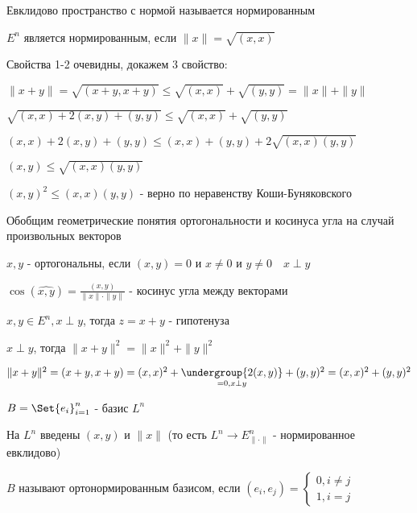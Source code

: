 \documentclass[12pt]{article}
\begin{document}
    \hypertarget{normalizedeuclidspace}{}

    Евклидово пространство с нормой называется нормированным

    \begin{MyTheorem}
        \Ths $E^n$ является нормированным, если $\|x\| = \sqrt{(x, x)}$
    \end{MyTheorem}

    \begin{MyProof}
        Свойства 1-2 очевидны, докажем 3 свойство:

        $\|x + y\| = \sqrt{(x + y, x + y)} \leq \sqrt{(x, x)} + \sqrt{(y, y)} = \|x\| + \|y\|$

        $\sqrt{(x, x) + 2(x, y) + (y, y)} \leq \sqrt{(x, x)} + \sqrt{(y, y)}$

        $(x, x) + 2(x, y) + (y, y) \leq (x, x) + (y, y) + 2\sqrt{(x, x)(y, y)}$

        $(x, y) \leq \sqrt{(x, x)(y, y)}$

        $(x, y)^2 \leq (x, x)(y, y)$ - верно по неравенству Коши-Буняковского
    \end{MyProof}

    Обобщим геометрические понятия ортогональности и косинуса угла на случай произвольных векторов

    \Def $x, y$ - ортогональны, если $(x, y) = 0$ и $x \neq 0$ и $y \neq 0 \quad x \perp y$

    \Def $\cos(\widehat{x, y}) = \frac{(x, y)}{\|x\|\cdot\|y\|}$ - косинус угла между векторами

    \Def $x, y \in E^n, x \perp y$, тогда $z = x + y$ - гипотенуза

    \begin{MyTheorem}
        \Ths $x \perp y$, тогда $\|x + y\|^2 = \|x\|^2 + \|y\|^2$
    \end{MyTheorem}

    \begin{MyProof}
        $\|x + y\|^2 = (x + y, x + y) = (x, x)^2 + \underset{= 0, x \perp y}{\undergroup{2(x, y)}} + (y, y)^2 = (x, x)^2 + (y, y)^2$
    \end{MyProof}

    \Def $B = \Set{e_i}_{i=1}^n$ - базис $L^n$

    На $L^n$ введены $(x, y)$ и $\|x\|$ (то есть $L^n \to E^n_{\|\cdot\|}$ - нормированное евклидово)

    \hypertarget{ortonormalizedbasis}{}

    $B$ называют ортонормированным базисом, если $(e_i, e_j) = \begin{cases}0, i \neq j \\ 1, i = j\end{cases}$
\end{document}
